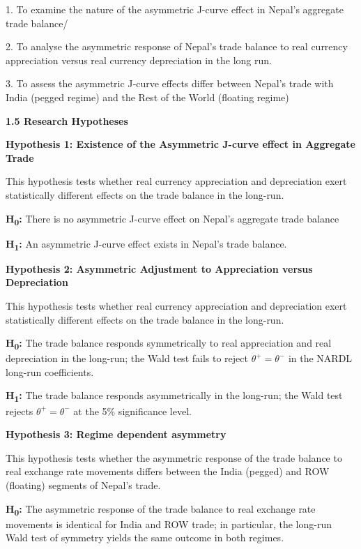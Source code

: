 \documentclass[12pt]{article}
\begin{document}
1. To examine the nature of the asymmetric J-curve effect in Nepal's aggregate trade balance/

2. To analyse the asymmetric response of Nepal's trade balance to real currency appreciation versus real currency depreciation in the long run.

3. To assess the asymmetric J‑curve effects differ between Nepal's  trade with India (pegged regime) and the Rest of the World (floating regime)


\vspace{0.5cm}
\noindent\textbf{1.5 Research Hypotheses}

\vspace{0.5cm}
\noindent\textbf{Hypothesis 1: Existence of the Asymmetric J-curve effect in Aggregate Trade}

This hypothesis tests whether real currency appreciation and depreciation exert statistically different effects on the trade balance in the long-run. 

\textbf{H\textsubscript{0}:} There is no asymmetric J-curve effect on Nepal's aggregate trade balance

\textbf{H\textsubscript{1}:} An asymmetric J-curve effect exists in Nepal's trade balance.

\vspace{0.5cm}
\noindent\textbf{Hypothesis 2: Asymmetric Adjustment to Appreciation versus Depreciation}

This hypothesis tests whether real currency appreciation and depreciation exert statistically different effects on the trade balance in the long-run. 

\textbf{H\textsubscript{0}:} The trade balance responds symmetrically to real appreciation and real depreciation in the long-run; the Wald test fails to reject $\theta^{+} = \theta^{-}$ in the NARDL long-run coefficients.

\textbf{H\textsubscript{1}:} The trade balance responds asymmetrically in the long-run; the Wald test rejects $\theta^{+} = \theta^{-}$ at the 5\% significance level.

\vspace{0.5cm}
\noindent\textbf{Hypothesis 3: Regime dependent asymmetry}

This hypothesis tests whether the asymmetric response of the trade balance to real exchange rate movements differs between the India (pegged) and ROW (floating) segments of Nepal's trade.

\textbf{H\textsubscript{0}:} The asymmetric response of the trade balance to real exchange rate movements is identical for India and ROW trade; in particular, the long-run Wald test of symmetry yields the same outcome in both regimes.
\end{document}
